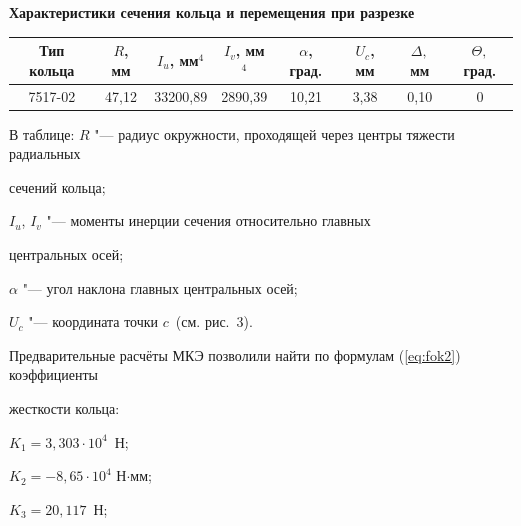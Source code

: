 \begin{table}[h!]\small

\centering

{\bf Характеристики сечения кольца и перемещения при разрезке}

\begin{tabular}{c|c|c|c|c|c|c|c}

\hline

Тип  кольца&

$R$,  мм&

$I_{u}$, мм$^{4}$&

$I_{v}$, мм$^{4}$&

$\alpha $, град.&

$U_{c}$, мм&

$\Delta ,$ мм&

$\Theta ,$ град. \\

\hline

7517-02&

47,12&

33200,89&

2890,39&

10,21&

3,38&

0,10&

0 \\

\hline

\end{tabular}

\end{table}



В таблице: $R$ "--- радиус окружности, проходящей через центры тяжести радиальных

сечений кольца;

$I_u $, $I_v $ "--- моменты инерции сечения относительно главных

центральных осей;

$\alpha $ "--- угол наклона главных центральных осей;

$U_c $ "--- координата точки $c$~(см. рис.~3).



Предварительные расчёты МКЭ позволили найти по формулам (\ref{eq:fok2}) коэффициенты

жесткости кольца:

$K_1 =3,303\cdot 10^4$~Н;

$K_2 =-8,65\cdot 10^4$ Н$\cdot$мм;

$K_3 =20,117$~Н;

